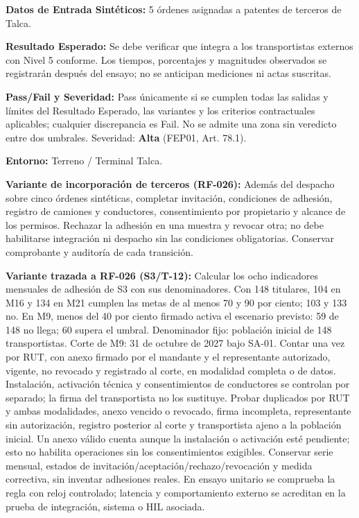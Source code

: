 \par\noindent\textbf{Datos de Entrada Sintéticos:} 5 órdenes asignadas a patentes de terceros de Talca.\par
\par\noindent\textbf{Resultado Esperado:} Se debe verificar que integra a los transportistas externos con Nivel 5 conforme. Los tiempos, porcentajes y magnitudes observados se registrarán después del ensayo; no se anticipan mediciones ni actas suscritas.\par
\par\noindent\textbf{Pass/Fail y Severidad:} Pass únicamente si se cumplen todas las salidas y límites del Resultado Esperado, las variantes y los criterios contractuales aplicables; cualquier discrepancia es Fail. No se admite una zona sin veredicto entre dos umbrales. Severidad: \textbf{Alta} (FEP01, Art. 78.1).\par
\par\noindent\textbf{Entorno:} Terreno / Terminal Talca.\par

\par\noindent\textbf{Variante de incorporación de terceros (RF-026):} Además del despacho sobre cinco órdenes sintéticas, completar invitación, condiciones de adhesión, registro de camiones y conductores, consentimiento por propietario y alcance de los permisos. Rechazar la adhesión en una muestra y revocar otra; no debe habilitarse integración ni despacho sin las condiciones obligatorias. Conservar comprobante y auditoría de cada transición.\par

\par\noindent\textbf{Variante trazada a RF-026 (S3/T-12):} Calcular los ocho indicadores mensuales de adhesión de S3 con sus denominadores. Con 148 titulares, 104 en M16 y 134 en M21 cumplen las metas de al menos 70 y 90 por ciento; 103 y 133 no. En M9, menos del 40 por ciento firmado activa el escenario previsto: 59 de 148 no llega; 60 supera el umbral. Denominador fijo: población inicial de 148 transportistas. Corte de M9: 31 de octubre de 2027 bajo SA-01. Contar una vez por RUT, con anexo firmado por el mandante y el representante autorizado, vigente, no revocado y registrado al corte, en modalidad completa o de datos. Instalación, activación técnica y consentimientos de conductores se controlan por separado; la firma del transportista no los sustituye. Probar duplicados por RUT y ambas modalidades, anexo vencido o revocado, firma incompleta, representante sin autorización, registro posterior al corte y transportista ajeno a la población inicial. Un anexo válido cuenta aunque la instalación o activación esté pendiente; esto no habilita operaciones sin los consentimientos exigibles. Conservar serie mensual, estados de invitación/aceptación/rechazo/revocación y medida correctiva, sin inventar adhesiones reales. En ensayo unitario se comprueba la regla con reloj controlado; latencia y comportamiento externo se acreditan en la prueba de integración, sistema o HIL asociada.\par

